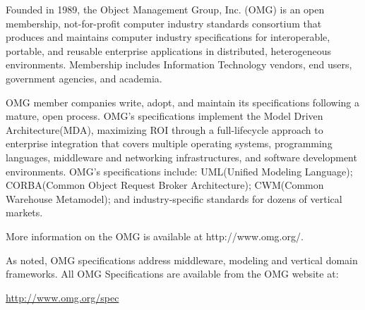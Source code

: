 \documentclass[10pt, a4paper, wd]{isov2}
\begin{document}
\renewcommand{\contentsname}{Table of Contents}
\tableofcontents





Founded in 1989, the Object Management Group, Inc. (OMG) is an open membership, not-for-profit computer industry standards consortium that produces and maintains computer industry specifications for interoperable, portable, and
 reusable enterprise applications in distributed, heterogeneous environments. Membership includes Information Technology vendors, end users, government agencies, and academia. 

OMG member companies write, adopt, and maintain its specifications following a mature, open process. OMG's specifications implement the Model Driven Architecture\textregistered\xspace (MDA\textregistered\xspace), maximizing ROI through a full-lifecycle approach to enterprise integration that covers multiple operating systems, programming languages, middleware and networking infrastructures, and software development environments. OMG's specifications include: UML\textregistered\xspace (Unified Modeling Language\texttrademark\xspace); CORBA\textregistered\xspace (Common Object Request Broker Architecture); CWM\texttrademark\xspace (Common Warehouse Metamodel); and industry-specific standards for dozens of vertical markets.

More information on the OMG is available at http://www.omg.org/.




As noted, OMG specifications address middleware, modeling and vertical domain frameworks. All OMG Specifications are available from the OMG website at:

\url{http://www.omg.org/spec}
\end{document}
